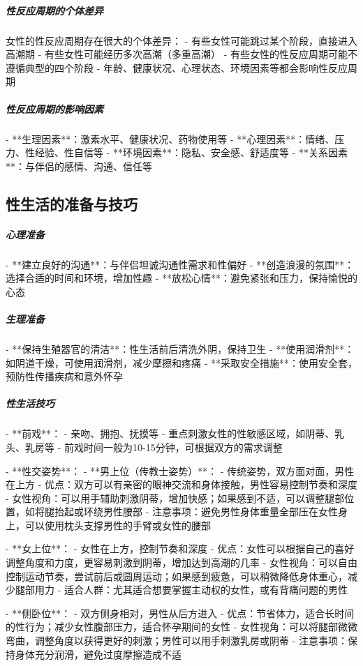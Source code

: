 \begin{enumerate}
\subparagraph{性反应周期的个体差异}

女性的性反应周期存在很大的个体差异：
- 有些女性可能跳过某个阶段，直接进入高潮期
- 有些女性可能经历多次高潮（多重高潮）
- 有些女性的性反应周期可能不遵循典型的四个阶段
- 年龄、健康状况、心理状态、环境因素等都会影响性反应周期

\subparagraph{性反应周期的影响因素}

- **生理因素**：激素水平、健康状况、药物使用等
- **心理因素**：情绪、压力、性经验、性自信等
- **环境因素**：隐私、安全感、舒适度等
- **关系因素**：与伴侣的感情、沟通、信任等

\subsection{性生活的准备与技巧}

\subparagraph{心理准备}

- **建立良好的沟通**：与伴侣坦诚沟通性需求和性偏好
- **创造浪漫的氛围**：选择合适的时间和环境，增加性趣
- **放松心情**：避免紧张和压力，保持愉悦的心态

\subparagraph{生理准备}

- **保持生殖器官的清洁**：性生活前后清洗外阴，保持卫生
- **使用润滑剂**：如阴道干燥，可使用润滑剂，减少摩擦和疼痛
- **采取安全措施**：使用安全套，预防性传播疾病和意外怀孕

\subparagraph{性生活技巧}

- **前戏**：
  - 亲吻、拥抱、抚摸等
  - 重点刺激女性的性敏感区域，如阴蒂、乳头、乳房等
  - 前戏时间一般为10-15分钟，可根据双方的需求调整

- **性交姿势**：
  - **男上位（传教士姿势）**：
    - 传统姿势，双方面对面，男性在上方
    - 优点：双方可以有亲密的眼神交流和身体接触，男性容易控制节奏和深度
    - 女性视角：可以用手辅助刺激阴蒂，增加快感；如果感到不适，可以调整腿部位置，如将腿抬起或环绕男性腰部
    - 注意事项：避免男性身体重量全部压在女性身上，可以使用枕头支撑男性的手臂或女性的腰部

  - **女上位**：
    - 女性在上方，控制节奏和深度
    - 优点：女性可以根据自己的喜好调整角度和力度，更容易刺激到阴蒂，增加达到高潮的几率
    - 女性视角：可以自由控制运动节奏，尝试前后或圆周运动；如果感到疲惫，可以稍微降低身体重心，减少腿部用力
    - 适合人群：尤其适合想要掌握主动权的女性，或有背痛问题的男性

  - **侧卧位**：
    - 双方侧身相对，男性从后方进入
    - 优点：节省体力，适合长时间的性行为；减少女性腹部压力，适合怀孕期间的女性
    - 女性视角：可以将腿部微微弯曲，调整角度以获得更好的刺激；男性可以用手刺激乳房或阴蒂
    - 注意事项：保持身体充分润滑，避免过度摩擦造成不适


\end{enumerate}
